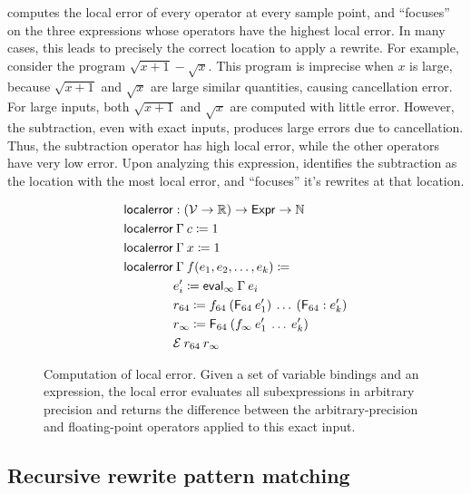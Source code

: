 \documentclass[paper.tex]{subfiles}
\begin{document}
\casio computes the local error of every operator at every sample point,
  and ``focuses'' on the three expressions
  whose operators have the highest local error.
In many cases, this leads \casio to precisely the correct location
  to apply a rewrite.
For example, consider the program $\sqrt{x+1} - \sqrt{x}$.
This program is imprecise when $x$ is large,
  because $\sqrt{x+1}$ and $\sqrt{x}$ are large similar quantities,
  causing cancellation error.
For large inputs, both $\sqrt{x+1}$ and $\sqrt{x}$
  are computed with little error.
However, the subtraction, even with exact inputs,
  produces large errors due to cancellation.
Thus, the subtraction operator has high local error,
  while the other operators have very low error.
Upon analyzing this expression, 
  \casio identifies the subtraction as the location with the most local error,
  and ``focuses'' it's rewrites at that location.

\begin{figure}
\begin{align*}
  \|localerror| &: (\Var \to \RR) \to \Expr \to \NN \\
  \|localerror| &\:\Gamma\:c \ceq 1 \\
  \|localerror| &\:\Gamma\:x \ceq 1 \\
  \|localerror| &\:\Gamma\:f(e_1, e_2, \ldots, e_k) \ceq \\
  & e_i' \ceq \|eval|_\infty\:\Gamma\:e_i \\
  & r_{64} \ceq f_{64}\:(\F_{64}\:e_1')\:\ldots\:(\F_{64}:e_k') \\
  & r_\infty \ceq \F_{64}\:(f_\infty\:e_1'\:\ldots\:e_k') \\
  & \Err\:r_{64}\:r_\infty \\
\end{align*}
\caption{Computation of local error.
  Given a set of variable bindings and an expression,
  the local error evaluates all subexpressions in arbitrary precision and returns
  the difference between the arbitrary-precision and floating-point operators
  applied to this exact input.}
\label{alg:focus}
\end{figure}

\subsection{Recursive rewrite pattern matching}
\end{document}
